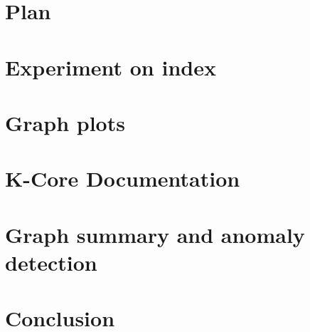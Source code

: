 \documentclass[12pt]{article}
\begin{document}
\section{Plan}
    \label{sec:plan}
    
    
\section{Experiment on index}
    \label{sec:indexexp}
    

\section{Graph plots}
    \label{sec:tengraphplots}
     

\section{K-Core Documentation}
   \label{sec:kcoredoc}
   

\section{Graph summary and anomaly detection}
   \label{sec:graphsummary}
   

\section{Conclusion}
   \label{sec:conclusion}
   




\newpage
{}
\tableofcontents
\end{document}
